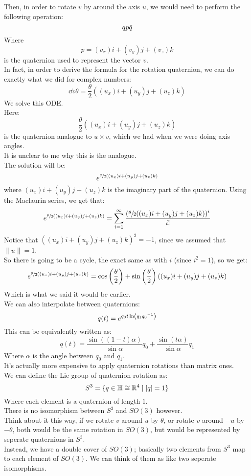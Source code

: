 \documentclass[12pt]{article}
\begin{document}
Then, in order to rotate $v$
by around the axis $u$,
we would need to perform the following
operation:
\[ qp\,\overline{\!{q}} \]
Where
\[ p = (v_x)i + (v_y)j + (v_z)k \]
is the quaternion used to represent
the vector $v$. \\

In fact, in order to derive the
formula for the rotation quaternion,
we can do exactly what we did for complex numbers:
\[ \dd{v}{\theta} = \dfrac{\theta}{2}
((u_x)i + (u_y)j + (u_z)k) \]
We solve this ODE. \\
Here:
\[ \dfrac{\theta}{2}
((u_x)i + (u_y)j + (u_z)k) \]
is the quaternion analogue to $u \times v$,
which we had when we were doing axis angles. \\
It is unclear to me why this is the analogue. \\

The solution will be:
\[ e^{\sfrac{\theta}{2}((u_x)i + (u_y)j + (u_z)k)} \]
where $(u_x)i + (u_y)j + (u_z)k$
is the imaginary part of the quaternion.
Using the Maclaurin series,
we get that:
\[ e^{\sfrac{\theta}{2}((u_x)i + (u_y)j + (u_z)k)}
= \sum_{i = 1}^{\infty}
\dfrac{(\sfrac{\theta}{2}
((u_x)i + (u_y)j + (u_z)k))^i}{i!} \]
Notice that $((u_x)i + (u_y)j + (u_z)k)^2 = -1$,
since we assumed that $\|u\| = 1$. \\
So there is going to be a cycle,
the exact same as with $i$ (since $i^2 = 1$),
so we get:
\[ e^{\sfrac{\theta}{2}((u_x)i + (u_y)j + (u_z)k)}
=  \cos \left( \dfrac{\theta}{2} \right)
+ \sin \left( \dfrac{\theta}{2} \right)
((u_x)i + (u_y)j + (u_z)k) \]
Which is what we said it would be earlier. \\

We can also interpolate between quaternions:
\[ q(t) = 
e^{{q_0t\ln\left( {q_1}{q_0}^{-1} \right)}} \]
This can be equivalently written as:
\[ q(t) = \frac{\sin((1 - t)\alpha)}{\sin \alpha} 
q_0 + \frac{\sin(t\alpha)}{\sin \alpha} q_1 \]
Where $\alpha$ is the angle between $q_0$
and $q_1$. \\

It's actually more expensive to apply
quaternion rotations than matrix ones. \\

We can define the Lie group of quaternion
rotation as:
\[ S^3 = \{ q \in \mathbb{H} \cong \mathbb{R}^4
\mid |q| = 1 \} \]
Where each element is a quaternion of
length $1$. \\

There is no isomorphism
between $S^3$ and $SO(3)$ however. \\
Think about it this way,
if we rotate $v$ around $u$ by $\theta$,
or rotate $v$ around $-u$ by $-\theta$,
both would be the same rotation in $SO(3)$,
but would be represented by seperate
quaternions in $S^3$. \\
Instead, we have a double cover of $SO(3)$;
basically two elements from $S^3$
map to each element of $SO(3)$.
We can think of them as like two seperate
isomorphisms. \\
\end{document}
